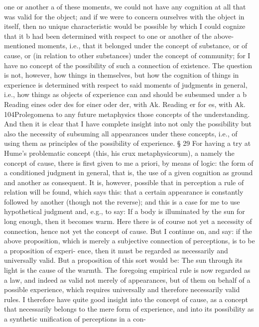 one or another a of these moments, we could not have any cognition at
all that was valid for the object; and if we were to concern ourselves with
the object in itself, then no unique characteristic would be possible by
which I could cognize that it b had been determined with respect to one
or another of the above-mentioned moments, i.e., that it belonged under
the concept of substance, or of cause, or (in relation to other substances)
under the concept of community; for I have no concept of the possibility
of such a connection of existence. The question is not, however, how
things in themselves, but how the cognition of things in experience is
determined with respect to said moments of judgments in general, i.e.,
how things as objects of experience can and should be subsumed under
a
b
Reading eines oder des for einer oder der, with Ak.
Reading er for es, with Ak.
104Prolegomena to any future metaphysics
those concepts of the understanding. And then it is clear that I have
complete insight into not only the possibility but also the necessity of
subsuming all appearances under these concepts, i.e., of using them as
principles of the possibility of experience.
§ 29
For having a try at Hume’s problematic concept (this, his crux
metaphysicorum), a namely the concept of cause, there is ﬁrst given to
me a priori, by means of logic: the form of a conditioned judgment in
general, that is, the use of a given cognition as ground and another as
consequent. It is, however, possible that in perception a rule of relation
will be found, which says this: that a certain appearance is constantly
followed by another (though not the reverse); and this is a case for me to
use hypothetical judgment and, e.g., to say: If a body is illuminated by
the sun for long enough, then it becomes warm. Here there is of course
not yet a necessity of connection, hence not yet the concept of cause.
But I continue on, and say: if the above proposition, which is merely a
subjective connection of perceptions, is to be a proposition of experi-
ence, then it must be regarded as necessarily and universally valid. But a
proposition of this sort would be: The sun through its light is the cause
of the warmth. The foregoing empirical rule is now regarded as a law,
and indeed as valid not merely of appearances, but of them on behalf of a
possible experience, which requires universally and therefore necessarily
valid rules. I therefore have quite good insight into the concept of cause,
as a concept that necessarily belongs to the mere form of experience,
and into its possibility as a synthetic uniﬁcation of perceptions in a con-
